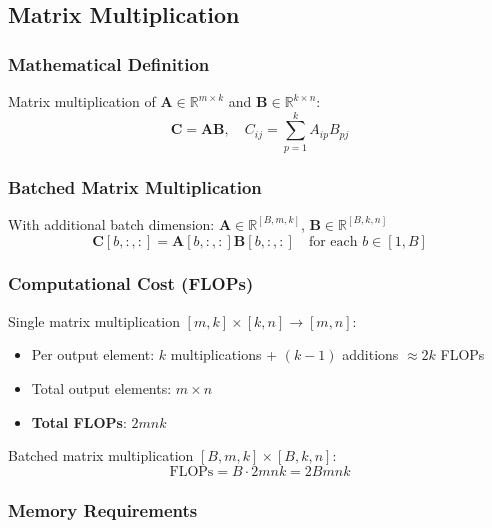 \documentclass[10pt]{article}
\begin{document}
\subsection{Matrix Multiplication}
\label{subsec:matmul}

\subsubsection{Mathematical Definition}

Matrix multiplication of $\mathbf{A} \in \mathbb{R}^{m \times k}$ and $\mathbf{B} \in \mathbb{R}^{k \times n}$:
\begin{equation}
\mathbf{C} = \mathbf{A}\mathbf{B}, \quad C_{ij} = \sum_{p=1}^{k} A_{ip} B_{pj}
\end{equation}

\subsubsection{Batched Matrix Multiplication}

With additional batch dimension: $\mathbf{A} \in \mathbb{R}^{[B,m,k]}$, $\mathbf{B} \in \mathbb{R}^{[B,k,n]}$
\begin{equation}
\mathbf{C}[b,:,:] = \mathbf{A}[b,:,:] \mathbf{B}[b,:,:] \quad \text{for each } b \in [1, B]
\end{equation}

\subsubsection{Computational Cost (FLOPs)}

Single matrix multiplication $[m,k] \times [k,n] \rightarrow [m,n]$:
\begin{itemize}
  \item Per output element: $k$ multiplications + $(k-1)$ additions $\approx 2k$ FLOPs
  \item Total output elements: $m \times n$
  \item \textbf{Total FLOPs}: $2mnk$
\end{itemize}

Batched matrix multiplication $[B,m,k] \times [B,k,n]$:
\begin{equation}
\text{FLOPs} = B \cdot 2mnk = 2Bmnk
\end{equation}

\subsubsection{Memory Requirements}
\end{document}
